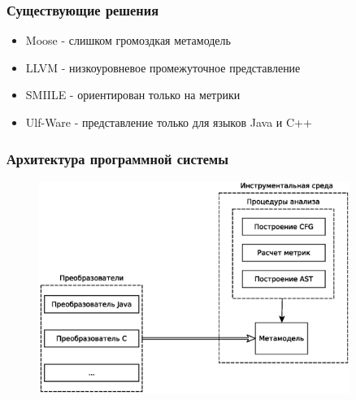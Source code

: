 \documentclass{beamer}
\begin{document}
\begin{frame}
\frametitle{Существующие решения}

\begin{itemize}
    \item Moose - слишком громоздкая метамодель
    \item LLVM - низкоуровневое промежуточное представление
    \item SMIILE - ориентирован только на метрики
    \item Ulf-Ware - представление только для языков Java и C++
\end{itemize}

\end{frame}
\begin{frame}
\frametitle{Архитектура программной системы}

\begin{figure}[b!]
    \begin{center}
        \includegraphics[width=0.9\textwidth]{fig/arch.eps}
    \end{center}
\end{figure}

\end{frame}
\end{document}

